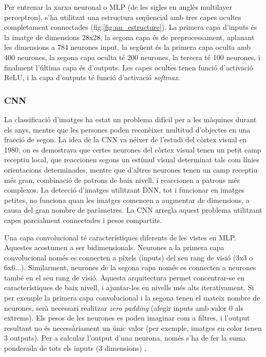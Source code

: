 \documentclass[12pt, spanish]{article}
\begin{document}
Per entrenar la xarxa neuronal o MLP (de les sigles en anglès multilayer perceptron), s'ha utilitzat una estructura seqüencial amb tres capes ocultes completament connectades (fig:\ref{fig:nn_estructure}). La primera capa d'inputs és la imatge de dimensions 28x28, la segona capa és de preprocessament, aplanant les dimensions a 784 neurones input, la següent és la primera capa oculta amb 400 neurones, la segona capa oculta té 200 neurones, la tercera té 100 neurones, i finalment l'última capa és d'outputs. Les capes ocultes tenen funció d'activació ReLU, i la capa d'outputs té funció d'activació \textit{softmax}. 




\subsubsection{CNN}

La classificació d'imatges ha estat un problema difícil per a les màquines durant els anys, mentre que les persones poden reconèixer multitud d'objectes en una fracció de segon. La idea de la CNN va néixer de l'estudi del còrtex visual en 1980, on es demostrava que certes neurones del còrtex visual tenen un petit camp receptiu local, que reaccionen segons un estímul visual determinat tals com línies orientacions determinades, mentre que d'altres neurones tenen un camp receptiu més gran, combinació de patrons de baix nivell, i reaccionen a patrons més complexos. La detecció d'imatges utilitzant DNN, tot i funcionar en imatges petites, no funciona quan les imatges comencen a augmentar de dimensions, a causa del gran nombre de paràmetres. La CNN arregla aquest problema utilitzant capes parcialment connectades i pesos compartits. 

Una capa convolucional té característiques diferents de les vistes en MLP. Aquestes acostumen a ser bidimensionals. Neurones a la primera capa convolucional només es connecten a píxels (inputs) del seu rang de visió (3x3 o 6x6...). Similarment, neurones de la segona capa només es connecten a neurones també en el seu rang de visió. Aquesta arquitectura permet concentrar-se en característiques de baix nivell, i ajuntar-les en nivells més alts iterativament. Si per exemple la primera capa convolucional i la segona tenen el mateix nombre de neurones, serà necessari realitzar \textit{zero padding} (afegir inputs amb valor 0 als extrems). Els pesos de les neurones es poden imaginar com a filtres, i l'output resultant no és necessàriament un únic valor (per exemple, imatges en color tenen 3 outputs). Per a calcular l'output d'una neurona, només s'ha de fer la suma ponderada de tots els inputs (3 dimensions) \cite[Cap. 14]{geron2019hands}.
\end{document}
